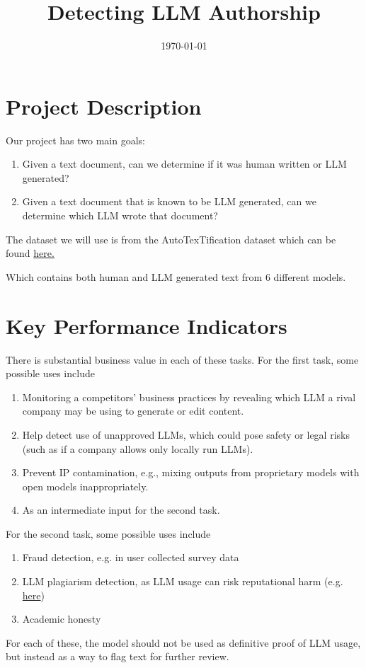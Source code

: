 \documentclass{article}
\title{Detecting LLM Authorship}
\date{\today}
\theoremstyle{definition}
\begin{document}
\maketitle

\section{Project Description}

Our project has two main goals:

\begin{enumerate}
    \item Given a text document, can we determine if it was human written or LLM generated?
    \item Given a text document that is known to be LLM generated, can we determine which LLM wrote that document?
\end{enumerate}

\noindent The dataset we will use is from the AutoTexTification dataset which can be found \href{https://huggingface.co/datasets/symanto/autextification2023}{here.}

Which contains both human and LLM generated text from 6 different models.

\section{Key Performance Indicators}

There is substantial business value in each of these tasks. For the first task, some possible uses include 
\begin{enumerate}
    \item Monitoring a competitors' business practices by revealing which LLM a rival company may  be using to generate or edit content.
    \item Help detect use of unapproved LLMs, which could pose safety or legal risks (such as if a company allows only locally run LLMs).
    \item Prevent IP contamination, e.g., mixing outputs from proprietary models with open models inappropriately.
    \item As an intermediate input for the second task.

\end{enumerate}

For the second task, some possible uses include 
\begin{enumerate}
    \item Fraud detection, e.g. in user collected survey data
    \item LLM plagiarism detection, as LLM usage can risk reputational harm (e.g. \href{https://www.404media.co/chicago-sun-times-prints-ai-generated-summer-reading-list-with-books-that-dont-exist/}{here})
    \item Academic honesty 
\end{enumerate}

For each of these, the model should not be used as definitive proof of LLM usage, but instead as a way to flag text for further review. 
\end{document}
